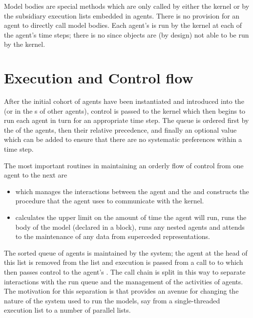 Model bodies are special methods which are only called by either the
kernel or by the subsidiary execution lists embedded in agents. There
is no provision for an agent to directly call model bodies.  Each
agent's  is run by the kernel at each of the
agent's time steps; there is no  since objects are
(by design) not able to be run by the kernel.

\section{Execution and Control flow}

After the initial cohort of agents have been instantiated and
introduced into the  (or in the
s of other agents), control is passed to
the kernel which then begins to run each agent in turn for an
appropriate time step. The queue is ordered first by the
 of the agents, then their relative precedence, and
finally an optional  value which can be added to ensure that
there are no systematic preferences within a time step.

The most important routines in maintaining an orderly flow of control
from one agent to the next are
\begin{itemize}
\item[\method{run-agent}] which manages the interactions between the
  agent and the  and constructs the procedure that the agent uses
  to communicate with the kernel.

\item[\method{run}] calculates the upper limit on the amount of time the
  agent will run, runs the body of the model (declared in a
   block), runs any nested agents and attends to 
  the maintenance of any data from superceded representations.
\end{itemize}

The sorted queue of agents is maintained by the system; the agent at
the head of this list is removed from the list and execution is passed
from a call to  to   which then passes
control to the agent's . The call chain is split in
this way to separate interactions with the run queue and the
management of the activities of agents.  The motivation for this
separation is that provides an avenue for changing the nature of the
system used to run the models, say from a single-threaded execution
list to a number of parallel lists.

